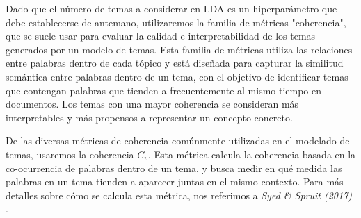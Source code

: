 \documentclass[
	spanish, %
	letterpaper, oneside
]{article}
\begin{document}
\newp Dado que el número de temas a considerar en LDA es un hiperparámetro que debe establecerse de antemano, utilizaremos la familia de métricas "coherencia", que se suele usar para evaluar la calidad e interpretabilidad de los temas generados por un modelo de temas. Esta familia de métricas utiliza las relaciones entre palabras dentro de cada tópico y está diseñada para capturar la similitud semántica entre palabras dentro de un tema, con el objetivo de identificar temas que contengan palabras que tienden a frecuentemente al mismo tiempo en documentos. Los temas con una mayor coherencia se consideran más interpretables y más propensos a representar un concepto concreto.


\newp De las diversas métricas de coherencia comúnmente utilizadas en el modelado de temas, usaremos la coherencia $C_v$. Esta métrica calcula la coherencia basada en la co-ocurrencia de palabras dentro de un tema, y busca medir en qué medida las palabras en un tema tienden a aparecer juntas en el mismo contexto. Para más detalles sobre cómo se calcula esta métrica, nos referimos a \textit{Syed \& Spruit (2017)} \cite{coherence}.

\end{document}
